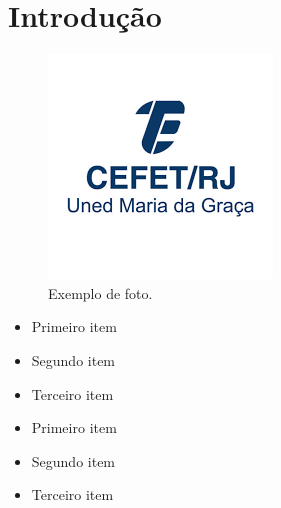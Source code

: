 \chapter{Introdução}
\label{sec:introducao}

\begin{figure}[H]
\centering
\includegraphics[width=0.5\linewidth]{imagens/cefet.png}
\caption{Exemplo de foto.}
\label{fig:cefet}
\end{figure}

\begin{itemize}
    \item Primeiro item
    \item Segundo item
    \item Terceiro item
\end{itemize}

\begin{itemize}
    \item Primeiro item
    \item Segundo item
    \item Terceiro item
\end{itemize}



\citep{8890660} %
\cite{8890660} %
